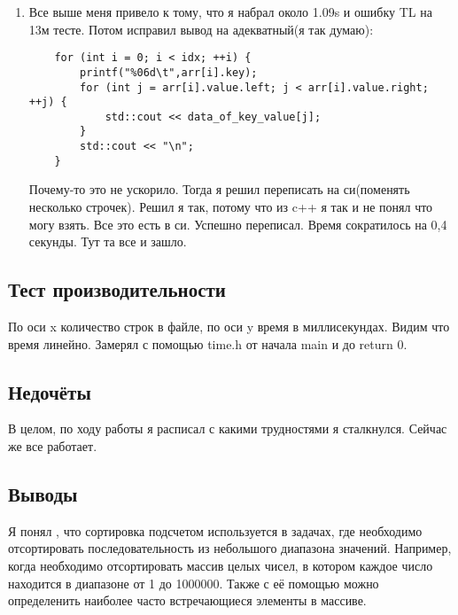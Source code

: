 \documentclass[12pt]{article}
\begin{document}
\begin{enumerate}
    \item Все выше меня привело к тому, что я набрал около 1.09s и ошибку TL на 13м тесте. Потом исправил вывод на адекватный(я так думаю):
\begin{lstlisting}
    for (int i = 0; i < idx; ++i) {
        printf("%06d\t",arr[i].key);
        for (int j = arr[i].value.left; j < arr[i].value.right; ++j) {
            std::cout << data_of_key_value[j];
        }
        std::cout << "\n";
    }
\end{lstlisting}
Почему-то это не ускорило. Тогда я решил переписать на си(поменять несколько строчек). Решил я так, потому что из c++ я так и не понял что могу взять. Все это есть в си. Успешно переписал. Время сократилось на 0,4 секунды. Тут та все и зашло.
\end{enumerate}

\subsection*{Тест производительности}

По оси x количество строк в файле, по оси y время в миллисекундах. Видим что время линейно. Замерял с помощью time.h от начала main и до return 0. 




\subsection*{Недочёты}

В целом, по ходу работы я расписал с какими трудностями я сталкнулся. Сейчас же все работает. 

\subsection*{Выводы}

Я понял , что сортировка подсчетом используется в задачах, где необходимо отсортировать последовательность из небольшого диапазона значений. Например, когда необходимо отсортировать массив целых чисел, в котором каждое число находится в диапазоне от 1 до 1000000. Также с её помощью можно определенить наиболее часто встречающиеся элементы в массиве.
\end{document}
